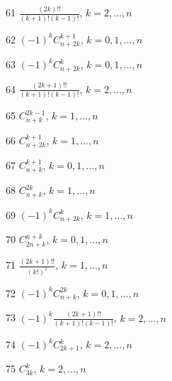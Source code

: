 \documentclass[11pt, russian]{article}
\begin{document}
61 
$\frac{(2k)!!}{(k+1)!(k-1)!}$, $k=2,\ldots,n$\par\vspace{5mm}

62 
$(-1)^{k}C_{n+2k}^{k+1}$, $k=0,1,\ldots,n$\par\vspace{5mm}

63 
$(-1)^{k}C_{n+2k}^{k}$, $k=0,1,\ldots,n$\par\vspace{5mm}

64 
$\frac{(2k+1)!!}{(k+1)!(k-1)!}$, $k=2,\ldots,n$\par\vspace{5mm}

65 
$C_{n+k}^{2k-1}$, $k=1,\ldots,n$\par\vspace{5mm}

66 
$C_{n+2k}^{k+1}$, $k=1,\ldots,n$\par\vspace{5mm}

67 
$C_{n+k}^{k+1}$, $k=0,1,\ldots,n$\par\vspace{5mm}

68 
$C_{n+k}^{2k}$, $k=1,\ldots,n$\par\vspace{5mm}

69 
$(-1)^{k}C_{n+2k}^{k}$, $k=1,\ldots,n$\par\vspace{5mm}

70 
$C_{2n+k}^{n+k}$, $k=0,1,\ldots,n$\par\vspace{5mm}

71 
$\frac{(2k+1)!!}{(k!)^2}$, $k=1,\ldots,n$\par\vspace{5mm}

72 
$(-1)^{k}C_{n+k}^{2k}$, $k=0,1,\ldots,n$\par\vspace{5mm}

73 
$(-1)^{k}\frac{(2k+1)!!}{(k+1)!(k-1)!}$, $k=2,\ldots,n$\par\vspace{5mm}

74 
$(-1)^{k}C_{2k+1}^{k}$, $k=2,\ldots,n$\par\vspace{5mm}

75 
$C_{3k}^{k}$, $k=2,\ldots,n$\par\vspace{5mm}
\end{document}
